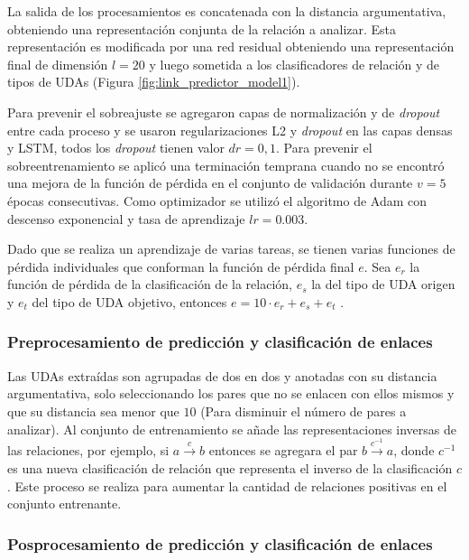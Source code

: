 \documentclass{rcci} %
\begin{document}
La salida de los procesamientos es concatenada con la distancia argumentativa, obteniendo una representaci\'on 
conjunta de la relaci\'on a analizar. Esta representaci\'on es modificada por una red residual obteniendo
una representaci\'on final de dimensi\'on $l=20$ y luego sometida a los clasificadores de relaci\'on y de tipos de UDAs
(Figura \ref{fig:link_predictor_model1}).

Para prevenir el sobreajuste se agregaron capas de normalizaci\'on y de \textit{dropout} entre cada 
proceso y se usaron regularizaciones L2 y \textit{dropout} en las capas densas y LSTM, 
todos los \textit{dropout} tienen valor $dr=0,1$. Para prevenir el sobreentrenamiento se aplic\'o una 
terminaci\'on temprana cuando no se encontr\'o una mejora de la funci\'on de p\'erdida en el 
conjunto de validaci\'on durante $v=5$ \'epocas consecutivas. Como optimizador se utiliz\'o el algoritmo de Adam con descenso 
exponencial y tasa de aprendizaje $lr=0.003$.

Dado que se realiza un aprendizaje de varias tareas, se tienen varias funciones de p\'erdida individuales que conforman 
la funci\'on de p\'erdida final $e$. Sea $e_r$ la funci\'on de p\'erdida de la clasificaci\'on de la relaci\'on, $e_s$ la del tipo de UDA origen  
y $e_t$ del tipo de UDA objetivo, entonces $e = 10 \cdot e_r + e_s + e_t$ \cite{galassi2021deep}.

\subsubsection*{Preprocesamiento de predicci\'on y clasificaci\'on de enlaces}

Las UDAs extra\'idas son agrupadas de dos en dos y anotadas con su distancia argumentativa, solo seleccionando
los pares que no se enlacen con ellos mismos y que su distancia sea menor que $10$ (Para disminuir el n\'umero 
de pares a analizar). Al conjunto de entrenamiento se a\~nade las representaciones inversas de las relaciones, por ejemplo, si $a \xrightarrow{c} b$ entonces 
se agregara el par $b \xrightarrow{c^{-1}} a$, donde $c^{-1}$ es una nueva clasificaci\'on de relaci\'on que representa
el inverso de la clasificaci\'on $c$. Este proceso se realiza para aumentar la cantidad de relaciones positivas en el
conjunto entrenante.

\subsubsection*{Posprocesamiento de predicci\'on y clasificaci\'on de enlaces}
\end{document}
